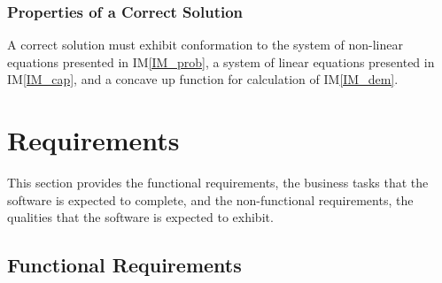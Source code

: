 \documentclass[12pt]{article}
\newcommand{\iref}[1]{IM\ref{#1}}
\begin{document}
  \subsubsection{Properties of a Correct Solution} \label{sec_CorrectSolution}

\noindent
A correct solution must exhibit conformation to the system of non-linear 
equations presented in \iref{IM_prob}, a system of linear equations presented in  \iref{IM_cap}, and a concave up function for calculation of \iref{IM_dem}.

\section{Requirements} \label{sec_Reqs}  

This section provides the functional requirements, the business tasks that the software is expected to complete, and the non-functional requirements, the qualities that the software is expected to exhibit.
  
\subsection{Functional Requirements} \label{Func}
\end{document}
